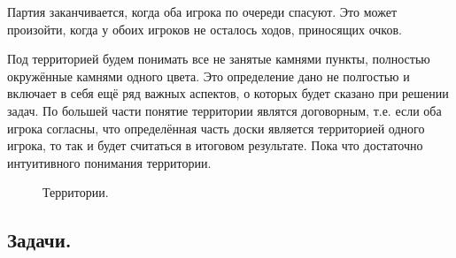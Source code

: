 \documentclass[14pt,a4paper]{extarticle}
\newcommand{\stone}[3]{\filldraw[color=black, fill=#3, very thick](#1,#2) circle(0.45);}
\newcommand{\territory}[3]{\filldraw[color=black, fill=#3, very thick](#1, #2) circle(0.125);}
\begin{document}
Партия заканчивается, когда оба игрока по очереди спасуют. Это может произойти, когда у обоих игроков не осталось ходов, приносящих очков.

Под территорией будем понимать все не занятые камнями пункты, полностью окружённые камнями одного цвета. Это определение дано не полгостью и включает в себя ещё ряд важных аспектов, о которых будет сказано при решении задач. По большей части понятие территории являтся договорным, т.е. если оба игрока согласны, что определённая часть доски является территорией одного игрока, то так и будет считаться в итоговом результате. Пока что достаточно интуитивного понимания территории.

\begin{figure}[h]
\centering
{}
\caption{Территории.}
\label{10}
\end{figure}


\newpage


\subsection*{Задачи.}
\end{document}
